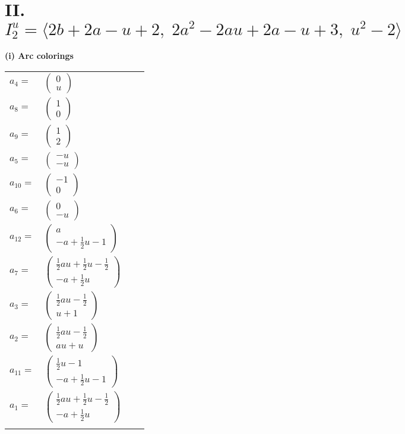 \documentclass[1p]{elsarticle_modified}
\theoremstyle{definition}
\begin{document}
\centering \section*{II. $I^u_{2}= \langle 2 b+2 a- u+2,\;2 a^2-2 a u+2 a- u+3,\;u^2-2 \rangle$}
\flushleft \textbf{(i) Arc colorings}\\
\begin{tabular}{m{7pt} m{180pt} m{7pt} m{180pt} }
\flushright $a_{4}=$&$\begin{pmatrix}0\\u\end{pmatrix}$ \\
\flushright $a_{8}=$&$\begin{pmatrix}1\\0\end{pmatrix}$ \\
\flushright $a_{9}=$&$\begin{pmatrix}1\\2\end{pmatrix}$ \\
\flushright $a_{5}=$&$\begin{pmatrix}- u\\- u\end{pmatrix}$ \\
\flushright $a_{10}=$&$\begin{pmatrix}-1\\0\end{pmatrix}$ \\
\flushright $a_{6}=$&$\begin{pmatrix}0\\- u\end{pmatrix}$ \\
\flushright $a_{12}=$&$\begin{pmatrix}a\\- a+\frac{1}{2} u-1\end{pmatrix}$ \\
\flushright $a_{7}=$&$\begin{pmatrix}\frac{1}{2} a u+\frac{1}{2} u-\frac{1}{2}\\- a+\frac{1}{2} u\end{pmatrix}$ \\
\flushright $a_{3}=$&$\begin{pmatrix}\frac{1}{2} a u-\frac{1}{2}\\u+1\end{pmatrix}$ \\
\flushright $a_{2}=$&$\begin{pmatrix}\frac{1}{2} a u-\frac{1}{2}\\a u+u\end{pmatrix}$ \\
\flushright $a_{11}=$&$\begin{pmatrix}\frac{1}{2} u-1\\- a+\frac{1}{2} u-1\end{pmatrix}$ \\
\flushright $a_{1}=$&$\begin{pmatrix}\frac{1}{2} a u+\frac{1}{2} u-\frac{1}{2}\\- a+\frac{1}{2} u\end{pmatrix}$\\&\end{tabular}
\end{document}
